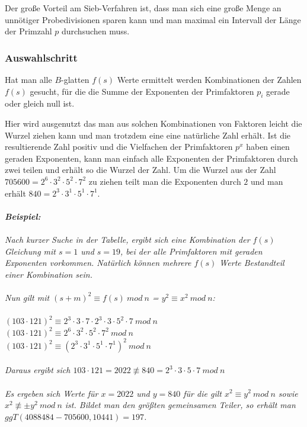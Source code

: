 \documentclass[10pt, bigheadings]{scrartcl}
\begin{document}
Der große Vorteil am Sieb-Verfahren ist, dass man sich eine große
Menge an unnötiger Probedivisionen sparen kann und man maximal
ein Intervall der Länge der Primzahl $p$ durchsuchen muss.

\subsubsection*{Auswahlschritt}
Hat man alle $B$-glatten $f(s)$ Werte ermittelt werden Kombinationen
der Zahlen $f(s)$ gesucht, für die die Summe der Exponenten der
Primfaktoren $p_i$ gerade oder gleich null ist.

Hier wird ausgenutzt das man aus solchen Kombinationen von Faktoren
leicht die Wurzel ziehen kann und man trotzdem eine eine natürliche
Zahl erhält. Ist die resultierende Zahl positiv und die Vielfachen
der Primfaktoren $p^x$ haben einen geraden Exponenten, kann man einfach
alle Exponenten der Primfaktoren durch zwei teilen und erhält so
die Wurzel der Zahl.
Um die Wurzel aus der Zahl $705600 = 2^6\cdot3^2\cdot5^2\cdot7^2$
zu ziehen teilt man die Exponenten durch $2$ und man erhält
$ 840 = 2^3\cdot3^1\cdot5^1\cdot7^1$.\\\\
{\it
\textbf{Beispiel:}\\\\
Nach kurzer Suche in der Tabelle, ergibt sich eine Kombination
der $f(s)$ Gleichung mit $s=1$ und $s=19$, bei der alle
Primfaktoren mit geraden Exponenten vorkommen. Natürlich
können mehrere $f(s)$ Werte Bestandteil einer Kombination
sein. \\\\
Nun gilt mit $(s+m)^2 \equiv f(s)\ mod\ n$ = $y^2 \equiv x^2\ mod\ n$:\\\\
$(103\cdot121)^2\equiv2^3\cdot3\cdot7\cdot2^3\cdot3\cdot5^2\cdot7\ mod\ n$\\
$(103\cdot121)^2\equiv2^6\cdot3^2\cdot5^2\cdot7^2\ mod\ n$\\
$(103\cdot121)^2\equiv(2^3\cdot3^1\cdot5^1\cdot7^1)^2\ mod\ n$\\\\
Daraus ergibt sich $103\cdot121 = 2022\not\equiv840 = 2^3\cdot3\cdot5\cdot7\ mod\ n$\\\\
Es ergeben sich Werte für $x = 2022$ und $y=840$ für die gilt $x^2\equiv y^2\ mod\ n$
sowie $x^2\not\equiv\pm y^2\ mod\ n$ ist. Bildet man den größten gemeinsamen Teiler,
so erhält man $ggT(4088484-705600, 10441) = 197$.
}
\end{document}

